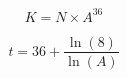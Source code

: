 \documentclass{article}
\begin{document}
\[
K = N \times A^{36}
\]



\[
t = 36 + \frac{\ln(8)}{\ln(A)}
\]
\end{document}
